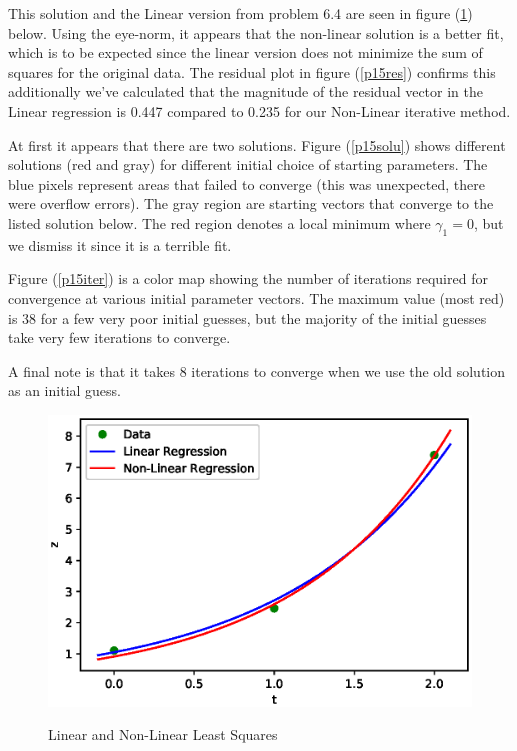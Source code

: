 \documentclass[12pt]{article}
\begin{document}
This solution and the Linear version from problem 6.4 are seen in figure (\ref{p15reg}) below. Using the eye-norm, it appears that the non-linear solution is a better fit, which is to be expected since the linear version does not minimize the sum of squares for the original data. The residual plot in figure (\ref{p15res}) confirms this additionally we've calculated that the magnitude of the residual vector in the Linear regression is 0.447 compared to 0.235 for our Non-Linear iterative method. \bigbreak

At first it appears that there are two solutions. Figure (\ref{p15solu}) shows different solutions (red and gray) for different initial choice of starting parameters. The blue pixels represent areas that failed to converge (this was unexpected, there were overflow errors). The gray region are starting vectors that converge to the listed solution below. The red region denotes a local minimum where $\gamma_1=0$, but we dismiss it since it is a terrible fit. \bigbreak

Figure (\ref{p15iter}) is a color map showing the number of iterations required for convergence at various initial parameter vectors. The maximum value (most red) is 38 for a few very poor initial guesses, but the majority of the initial guesses take very few iterations to converge. \bigbreak

A final note is that it takes 8 iterations to converge when we use the old solution as an initial guess.

\begin{figure}[H]
	\caption{Linear and Non-Linear Least Squares}
	\includegraphics[width=1\textwidth]{hwch9_p15_figure_2}
	\label{p15reg}
	\centering
\end{figure}
\end{document}
